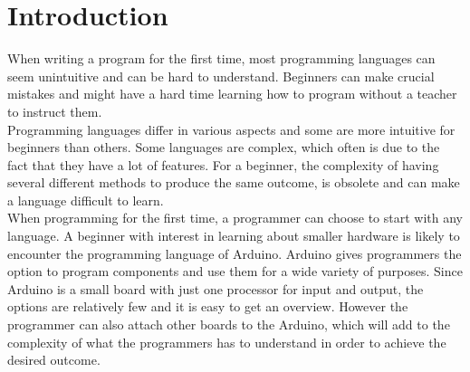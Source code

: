 \section{Introduction}
When writing a program for the first time, most programming languages can seem unintuitive and can be hard to understand. Beginners can make crucial mistakes and might have a hard time learning how to program without a teacher to instruct them.\\

Programming languages differ in various aspects and some are more intuitive for beginners than others. Some languages are complex, which often is due to the fact that they have a lot of features. For a beginner, the complexity of having several different methods to produce the same outcome, is obsolete and can make a language difficult to learn. \\

When programming for the first time, a programmer can choose to start with any language. A beginner with interest in learning about smaller hardware is likely to encounter the programming language of Arduino. Arduino gives programmers the option to program components and use them for a wide variety of purposes. Since Arduino is a small board with just one processor for input and output, the options are relatively few and it is easy to get an overview. However the programmer can also attach other boards to the Arduino, which will add to the complexity of what the programmers has to understand in order to achieve the desired outcome. \\